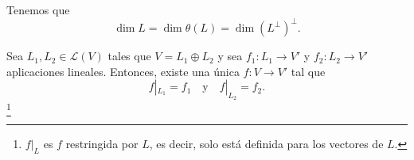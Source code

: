 \begin{observation}
\normalfont Tenemos que 
\[\dim L = \dim \theta\left(L\right) = \dim \left(L^{\perp}\right)^{\perp} .\]
\end{observation}

\begin{flema}[]
\normalfont Sea $\displaystyle L_{1}, L_{2} \in \mathcal{L}\left(V\right) $ tales que $\displaystyle V = L_{1}\oplus L_{2} $ y sea $\displaystyle f_{1} : L_{1} \to V' $ y $\displaystyle f_{2}: L_{2} \to V' $ aplicaciones lineales. Entonces, existe una única $\displaystyle f : V \to V' $ tal que 
\[f|_{L_{1}} = f_{1} \quad \text{y} \quad f|_{L_{2}} = f_{2} .\]
\footnote{ $\displaystyle f|_{L} $ es $\displaystyle f $ restringida por $\displaystyle L $, es decir, solo está definida para los vectores de $\displaystyle L $.} 
\end{flema}

